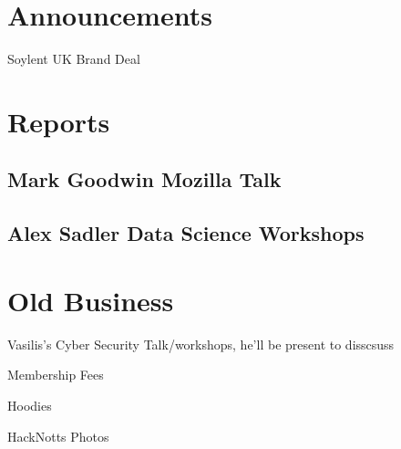 \documentclass[11pt,hacksoc,agenda]{meetingmins}
\begin{document}
\maketitle

\section{Announcements}
\begin{items}

	\item
	Soylent UK Brand Deal

\end{items}

\section{Reports}

\subsection{Mark Goodwin Mozilla Talk}
\begin{hiddensubitems}
\item
\end{hiddensubitems}

\subsection{Alex Sadler Data Science Workshops}
\begin{hiddensubitems}
\item
\end{hiddensubitems}

\section{Old Business}
\begin{items}
	\item
	Vasilis's Cyber Security Talk/workshops, he'll be present to disscsuss
	
	\item
	Membership Fees
	
	\item
	Hoodies
	
	\item
	HackNotts Photos
	
\end{items}
\end{document}
